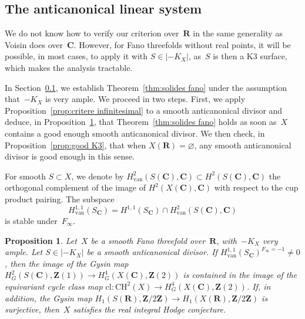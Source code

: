 \documentclass[JEP,XML,SOM,Unicode]{cedram}
\theoremstyle{plain}
\newtheorem{prop}[thm]{Proposition}
\theoremstyle{definition}
\numberwithin{equation}{section}
\newcommand{\cl}{{\mathrm{cl}}}
\renewcommand{\C}{{\mathbf C}}
\newcommand{\R}{{\mathbf R}}
\newcommand{\Z}{{\mathbf Z}}
\newcommand{\CH}{\mathrm{CH}}
\renewcommand{\emptyset}{\varnothing}
\newcommand{\van}{\mathrm{van}}
\begin{document}
\subsection{The anticanonical linear system}
\label{par:systeme anticanonique}

We do not know how to verify our criterion over~$\R$ in the same generality as Voisin does over~$\C$.
However, for Fano threefolds without real points, it will be possible,
in most cases, to apply it with $S\in|{-}K_X|$,
as~$S$ is then a K3 surface, which makes the analysis tractable.

In Section~\ref{par:systeme anticanonique}, we establish
Theorem~\ref{thm:solides fano}
under the assumption that~$-K_X$ is very ample.
We proceed in two steps.
First,
we apply
Proposition~\ref{prop:critere infinitesimal} to a
smooth anticanonical divisor
and deduce, in Proposition~\ref{prop:preuve Fano 1},
that Theorem~\ref{thm:solides fano}
holds as soon as~$X$ contains a good enough smooth anticanonical divisor.
We then check,
in Proposition~\ref{prop:good K3},
that
when $X(\R)=\emptyset$,
any smooth anticanonical divisor is good enough in this sense.

For smooth $S \subset X$,
we denote by $H^2_\van(S(\C),\C)\subset H^2(S(\C),\C)$
the orthogonal complement
of the image of $H^2(X(\C),\C)$
with respect to the cup product pairing.
The subspace
\[
H_\van^{1,1}(S_\C) = H^{1,1}(S_\C) \cap H^2_\van(S(\C),\C)
\]
is stable under~$F_\infty$.

\begin{prop}
\label{prop:preuve Fano 1}
Let~$X$ be a smooth Fano threefold over~$\R$, with~$-K_X$ very ample.
Let $S \in |{-}K_X|$ be a smooth anticanonical divisor.
If $H_{\van}^{1,1}(S_{\C})^{F_\infty=-1}\neq 0$,
then the image of the Gysin map $H^2_G(S(\C),\Z(1)) \to H^4_G(X(\C),\Z(2))$
is contained in the image of the equivariant cycle class map
$\cl:\CH^2(X) \to H^4_G(X(\C),\Z(2))$.
If, in addition,
the Gysin map $H_1(S(\R),\Z/2\Z)\to H_1(X(\R),\Z/2\Z)$
is surjective,
then~$X$ satisfies the real integral Hodge conjecture.
\end{prop}
\end{document}
